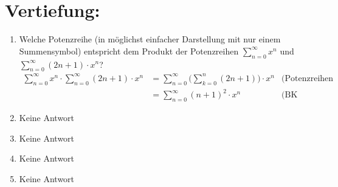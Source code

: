 



    \maketitle
    \section*{Vertiefung:}
    \begin{enumerate}[label=(\alph*)]
        \item Welche Potenzreihe (in möglichst einfacher Darstellung mit nur einem Summensymbol) entspricht dem Produkt der Potenzreihen $\displaystyle\sum_{n=0}^{\infty} x^n$ und $\displaystyle\sum_{n=0}^{\infty} (2n+1)\cdot x^n$?\\
        \begin{align*}
            \sum_{n=0}^{\infty} x^n \cdot \sum_{n=0}^{\infty} (2n+1)\cdot x^n &= 
            \sum_{n=0}^{\infty} \Bigg(\sum_{k=0}^{n} (2n+1)\Bigg) \cdot x^n &\textrm{(Potenzreihen Rechnenregeln)}\\
            &= \sum_{n=0}^{\infty} (n+1)^2 \cdot x^n &\textrm{(BK Proposition 3.B)}
        \end{align*}

        \item Keine Antwort

        \item Keine Antwort

        \item Keine Antwort

        \item Keine Antwort


\end{enumerate}
